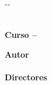 {\begin{cambiamargen}{-\cambioIzquierdo}{-\cambioDerecho}
    \begin{center}
      {\Large \textbf{\tipoDocumentoVal}}\\
      {\Large \textbf{Curso \thelastyear--\the\year}}

    \end{center}

    \vfill

    \begin{large}
      \begin{center}
        {\Large \bfseries Autor}\\
        \textbf{\autorPortadaVal}\\[0.5cm]
        {\Large \bfseries Directores}\\
        \textbf{\directorPortadaVal}\\[0.5cm]
        \textbf{\institucionVal}\\[1em]
      \end{center}
    \end{large}

    \vfill

  \end{cambiamargen}

  \newpage

  \thispagestyle{empty}
  \mbox{ }


  \newpage

}
